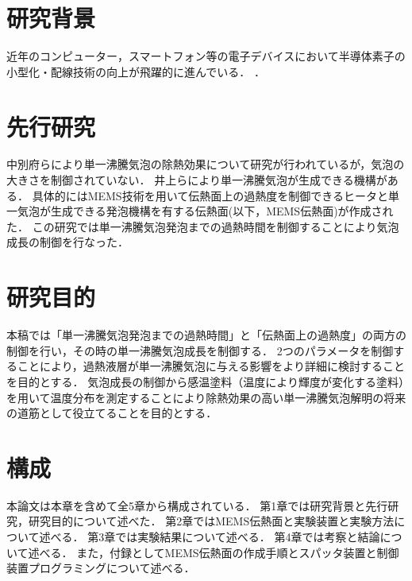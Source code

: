 
\section{研究背景}
近年のコンピューター，スマートフォン等の電子デバイスにおいて半導体素子の小型化・配線技術の向上が飛躍的に進んでいる．
．

\section{先行研究}
中別府ら\cite{Nakabeppu2014}により単一沸騰気泡の除熱効果について研究が行われているが，気泡の大きさを制御されていない．
井上ら\cite{Inoue2016}により単一沸騰気泡が生成できる機構がある．
具体的にはMEMS技術を用いて伝熱面上の過熱度を制御できるヒータと単一気泡が生成できる発泡機構を有する伝熱面(以下，MEMS伝熱面)が作成された．
この研究では単一沸騰気泡発泡までの過熱時間を制御することにより気泡成長の制御を行なった．

\section{研究目的}
本稿では「単一沸騰気泡発泡までの過熱時間」と「伝熱面上の過熱度」の両方の制御を行い，その時の単一沸騰気泡成長を制御する．
2つのパラメータを制御することにより，過熱液層が単一沸騰気泡に与える影響をより詳細に検討することを目的とする．
気泡成長の制御から感温塗料（温度により輝度が変化する塗料）を用いて温度分布を測定することにより除熱効果の高い単一沸騰気泡解明の将来の道筋として役立てることを目的とする．

\section{構成}
本論文は本章を含めて全5章から構成されている．
第1章では研究背景と先行研究，研究目的について述べた．
第2章ではMEMS伝熱面と実験装置と実験方法について述べる．
第3章では実験結果について述べる．
第4章では考察と結論について述べる．
また，付録としてMEMS伝熱面の作成手順とスパッタ装置と制御装置プログラミングについて述べる．
